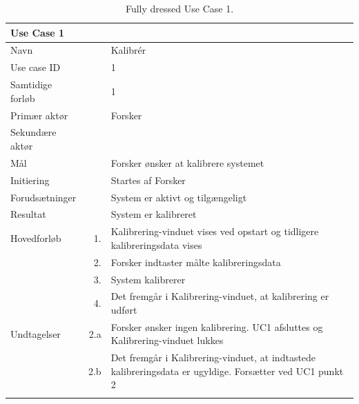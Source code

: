 \begin{longtabu} to  %
    {\large \textbf{Use Case 1}} && \\
    \toprule
    Navn &&    Kalibrér\\
    Use case ID &&    1\\
    Samtidige forløb &&    1\\
    Primær aktør &&    Forsker\\
    Sekundære aktør &&	 \\
    Mål &&    Forsker ønsker at kalibrere systemet\\
    Initiering &&	Startes af Forsker\\
    Forudsætninger &&  System er aktivt og tilgængeligt\\
    Resultat &&		System er kalibreret                         \\ \midrule
    Hovedforløb &    1. &	 Kalibrering-vinduet vises ved opstart og 					tidligere kalibreringsdata vises\\[-1ex]  
    			&	 2. &	 Forsker indtaster målte kalibreringsdata    			\\
                &    3.	&	 System kalibrerer\\
                &	 4. &	 Det fremgår i Kalibrering-vinduet, at kalibrering er udført \newline\\ \midrule
                
    Undtagelser &    2.a &   Forsker ønsker ingen kalibrering. UC1 afsluttes og Kalibrering-vinduet lukkes  \\
    			&	 2.b &	 Det fremgår i Kalibrering-vinduet, at indtastede kalibreringsdata er ugyldige. Forsætter ved UC1 punkt 2  \\ \bottomrule
\caption{Fully dressed Use Case 1.}
\label{UC1}
\end{longtabu}


